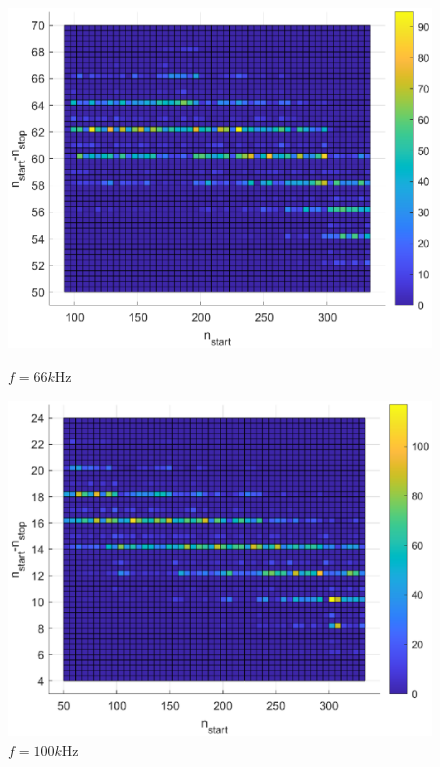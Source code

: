 \clearpage
\begin{figure}[H]
     \centering
     \begin{minipage}{0.45\textwidth}
         \centering
         \includegraphics[width=\textwidth]{imagenes/start-stop_66k.eps} %
         \caption{$f = 66k$Hz}
     \end{minipage}\hfill
     \begin{minipage}{0.45\textwidth}
         \centering
         \includegraphics[width=\textwidth]{imagenes/start-stop_100k.eps} %
         \caption{$f = 100k$Hz}
     \end{minipage}
     

\end{figure}
